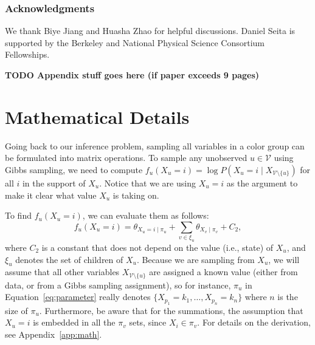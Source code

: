 \documentclass{article} %
\begin{document}
\subsubsection*{Acknowledgments}

We thank Biye Jiang and Huasha Zhao for helpful discussions. Daniel Seita is supported by the
Berkeley and National Physical Science Consortium Fellowships.













\clearpage
\appendix

\textbf{TODO Appendix stuff goes here (if paper exceeds 9 pages)}

\section{Mathematical Details}

Going back to our inference problem, sampling all variables in a color group can be formulated into
matrix operations. To sample any unobserved $u \in \mathcal{V}$ using Gibbs sampling, we need to
compute $f_u(X_u = i) = \log P(X_u = i \mid X_{\mathcal{V} \setminus \{u\}})$ for all $i$ in the
support of $X_u$. Notice that we are using $X_u = i$ as the argument to make it clear what value
$X_u$ is taking on.

To find $f_u(X_u = i)$, we can evaluate them as follows:
\begin{equation}\label{eq:parameter}
f_u(X_u = i) = \theta_{X_u=i \mid \pi_u} + \sum\limits_{v \in \xi_u} \theta_{X_v \mid \pi_v} + C_2,
\end{equation}
where $C_2$ is a constant that does not depend on the value (i.e., state) of $X_u$, and $\xi_u$
denotes the set of children of $X_u$. Because we are sampling from $X_u$, we will assume that all
other variables $X_{\mathcal{V}\setminus \{u\}}$ are assigned a known value (either from data, or
from a Gibbs sampling assignment), so for instance, $\pi_u$ in Equation~\ref{eq:parameter} really
denotes $\{X_{p_1} = k_1, \ldots, X_{p_n} = k_n\}$ where $n$ is the size of $\pi_u$. Furthermore, be
aware that for the summations, the assumption that $X_u = i$ is embedded in all the $\pi_v$ sets,
since $X_i \in \pi_v$. For details on the derivation, see Appendix~\ref{app:math}.
\end{document}
